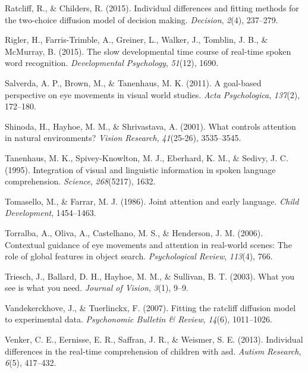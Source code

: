 \documentclass[,man,floatsintext]{apa6}
\begin{document}
\leavevmode\hypertarget{ref-ratcliff2015individual}{}%
Ratcliff, R., \& Childers, R. (2015). Individual differences and fitting methods for the two-choice diffusion model of decision making. \emph{Decision}, \emph{2}(4), 237--279.

\leavevmode\hypertarget{ref-rigler2015slow}{}%
Rigler, H., Farris-Trimble, A., Greiner, L., Walker, J., Tomblin, J. B., \& McMurray, B. (2015). The slow developmental time course of real-time spoken word recognition. \emph{Developmental Psychology}, \emph{51}(12), 1690.

\leavevmode\hypertarget{ref-salverda2011goal}{}%
Salverda, A. P., Brown, M., \& Tanenhaus, M. K. (2011). A goal-based perspective on eye movements in visual world studies. \emph{Acta Psychologica}, \emph{137}(2), 172--180.

\leavevmode\hypertarget{ref-shinoda2001controls}{}%
Shinoda, H., Hayhoe, M. M., \& Shrivastava, A. (2001). What controls attention in natural environments? \emph{Vision Research}, \emph{41}(25-26), 3535--3545.

\leavevmode\hypertarget{ref-tanenhaus1995integration}{}%
Tanenhaus, M. K., Spivey-Knowlton, M. J., Eberhard, K. M., \& Sedivy, J. C. (1995). Integration of visual and linguistic information in spoken language comprehension. \emph{Science}, \emph{268}(5217), 1632.

\leavevmode\hypertarget{ref-tomasello1986joint}{}%
Tomasello, M., \& Farrar, M. J. (1986). Joint attention and early language. \emph{Child Development}, 1454--1463.

\leavevmode\hypertarget{ref-torralba2006contextual}{}%
Torralba, A., Oliva, A., Castelhano, M. S., \& Henderson, J. M. (2006). Contextual guidance of eye movements and attention in real-world scenes: The role of global features in object search. \emph{Psychological Review}, \emph{113}(4), 766.

\leavevmode\hypertarget{ref-triesch2003you}{}%
Triesch, J., Ballard, D. H., Hayhoe, M. M., \& Sullivan, B. T. (2003). What you see is what you need. \emph{Journal of Vision}, \emph{3}(1), 9--9.

\leavevmode\hypertarget{ref-vandekerckhove2007fitting}{}%
Vandekerckhove, J., \& Tuerlinckx, F. (2007). Fitting the ratcliff diffusion model to experimental data. \emph{Psychonomic Bulletin \& Review}, \emph{14}(6), 1011--1026.

\leavevmode\hypertarget{ref-venker2013individual}{}%
Venker, C. E., Eernisse, E. R., Saffran, J. R., \& Weismer, S. E. (2013). Individual differences in the real-time comprehension of children with asd. \emph{Autism Research}, \emph{6}(5), 417--432.
\end{document}

